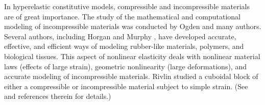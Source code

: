 \documentclass[11pt,letter,subeqn,fleqn]{article}
\numberwithin{equation}{section}
\numberwithin{table}{section}
\numberwithin{figure}{section}
\begin{document}
%
 In hyperelastic constitutive models, compressible and incompressible materials are of great importance. The study of the mathematical and computational modeling of incompressible materials was conducted by Ogden \cite{ogden1972large,ogden1979biaxial,ogden1997non} and many authors. Several authors, including  Horgan and Murphy \cite{horgan2007constitutive,horgan2010simple}, have developed accurate, effective, and efficient ways of modeling rubber-like materials, polymers, and biological tissues. This aspect of nonlinear elasticity deals with nonlinear material laws (effects of large strain), geometric nonlinearity (large deformations), and accurate modeling of incompressible materials. Rivlin \cite{rivlin1948large} studied a cuboidal block of either a compressible or incompressible material subject to simple strain. (See \cite{adler2014mathematical} and references therein for details.)
\end{document}
